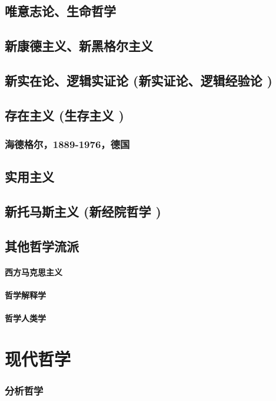 \documentclass[UTF8]{../RepresentationUniverse}
\begin{document}
    \section{唯意志论、生命哲学}
    \section{新康德主义、新黑格尔主义}
    \section{新实在论、逻辑实证论 (新实证论、逻辑经验论 )}



\section{存在主义 (生存主义 )}

    \subsection{海德格尔，1889-1976，德国}




    \section{实用主义}
    \section{新托马斯主义 (新经院哲学 )}
    \section{其他哲学流派}
        \subsubsection{西方马克思主义}
        \subsubsection{哲学解释学}
        \subsubsection{哲学人类学}
    

\chapter{现代哲学}
    \subsection{分析哲学}
\end{document}
